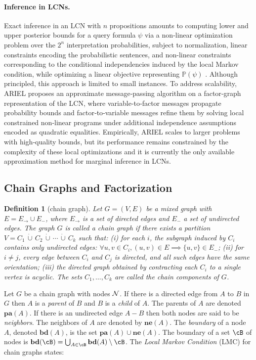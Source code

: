 \documentclass{article}
\newtheorem{definition}{Definition}
\newcommand{\pr}[1]{\mathbb{P}\!\left( #1 \right)}
\begin{document}
\paragraph{Inference in LCNs.}
Exact inference in an LCN with $n$ propositions amounts to computing lower and upper posterior bounds for a query formula $\psi$ via a non‑linear optimization problem over the $2^n$ interpretation probabilities, subject to normalization, linear constraints encoding the probabilistic sentences, and non-linear constraints corresponding to the conditional independencies induced by the local Markov condition, while optimizing a linear objective representing $\pr{\psi}$ \cite{marinescu2022neurips}. Although principled, this approach is limited to small instances. To address scalability, ARIEL \cite{marinescu2023lcn} proposes an approximate message‑passing algorithm on a factor‑graph representation of the LCN, where variable‑to‑factor messages propagate probability bounds and factor‑to‑variable messages refine them by solving local constrained non‑linear programs under additional independence assumptions encoded as quadratic equalities. Empirically, ARIEL scales to larger problems with high‑quality bounds, but its performance remains constrained by the complexity of these local optimizations and it is currently the only available approximation method for marginal inference in LCNs.


\subsection{Chain Graphs and Factorization}

\begin{definition}[chain graph]
Let $G = (V, E)$ be a mixed graph with $E = E_{\to} \cup E_{-}$, where $E_{\to}$ is a set of directed edges and $E_{-}$ a set of undirected edges. The graph $G$ is called a \emph{chain graph} if there exists a partition
$V = C_1 \,\dot\cup\, C_2 \,\dot\cup\, \cdots \,\dot\cup\, C_k$
such that: (i) for each $i$, the subgraph induced by $C_i$ contains only undirected edges: $\forall u,v \in C_i, (u,v)\in E \implies \{u,v\}\in E_{-}$; (ii) for $i \neq j$, every edge between $C_i$ and $C_j$ is directed, and all such edges have the same orientation; (iii) the directed graph obtained by contracting each $C_i$ to a single vertex is acyclic. The sets $C_1,\dots,C_k$ are called the \emph{chain components} of $G$.
\end{definition}

Let $G$ be a chain graph with nodes $\mathcal{N}$. If there is a directed edge from $A$ to $B$ in $G$ then $A$ is a \emph{parent} of $B$ and $B$ is a \emph{child} of $A$. The parents of $A$ are denoted $\mathbf{pa}(A)$. If there is an undirected edge $A-B$ then both nodes are said to be \emph{neighbors}. The neighbors of $A$ are denoted by $\mathbf{ne}(A)$. The \emph{boundary} of a node $A$, denoted $\mathbf{bd}(A)$, is the set $\mathbf{pa}(A)\cup \mathbf{ne}(A)$. The boundary of a set $\cB$ of nodes is $\mathbf{bd}(\cB) = \bigcup_{A\in \cB} \mathbf{bd}(A) \setminus \cB$. The \emph{Local Markov Condition} (LMC) for chain graphs states:
\end{document}
